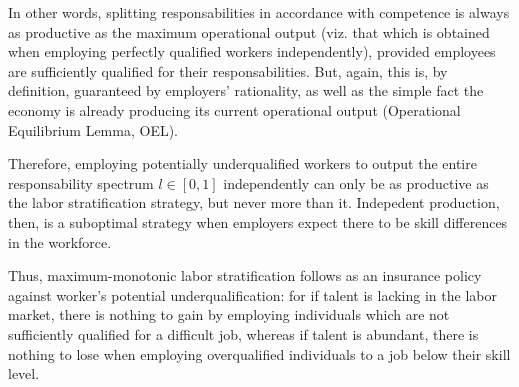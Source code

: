 \documentclass[hidelinks, nonatbib]{elsarticle}
\begin{document}
\begin{enumerate}
\begin{enumerate}
\begin{enumerate}
            In other words, splitting responsabilities in accordance with competence is always as productive as the maximum operational output (viz. that which is obtained when employing perfectly qualified workers independently), provided employees are sufficiently qualified for their responsabilities. But, again, this is, by definition, guaranteed by employers' rationality, as well as the simple fact the economy is already producing its current operational output (Operational Equilibrium Lemma, OEL). 
            
            Therefore, employing potentially underqualified workers to output the entire responsability spectrum $l \in [0,1]$ independently can only be as productive as the labor stratification strategy, but never more than it. Indepedent production, then, is a suboptimal strategy when employers expect there to be skill differences in the workforce.
            
            Thus, maximum-monotonic labor stratification follows as an insurance policy against worker's potential underqualification: for if talent is lacking in the labor market, there is nothing to gain by employing individuals which are not sufficiently qualified for a difficult job, whereas if talent is abundant, there is nothing to lose when employing overqualified individuals to a job below their skill level.


\end{enumerate}
\end{enumerate}
\end{enumerate}
\end{document}
